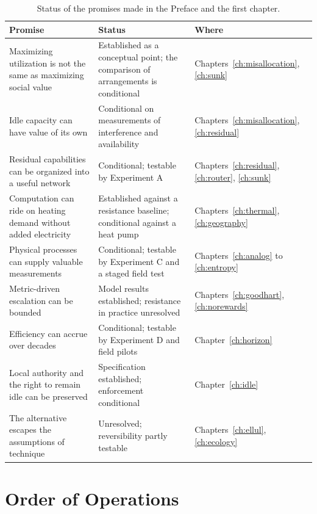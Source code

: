 \begin{table}[ht]
\centering
\small
\begin{tabular}{>{\raggedright\arraybackslash}p{2.3in}>{\raggedright\arraybackslash}p{1.9in}>{\raggedright\arraybackslash}p{1.1in}}
\toprule
Promise & Status & Where \\
\midrule
Maximizing utilization is not the same as maximizing social value & Established as a conceptual point; the comparison of arrangements is conditional & Chapters~\ref{ch:misallocation}, \ref{ch:sunk} \\
Idle capacity can have value of its own & Conditional on measurements of interference and availability & Chapters~\ref{ch:misallocation}, \ref{ch:residual} \\
Residual capabilities can be organized into a useful network & Conditional; testable by Experiment A & Chapters~\ref{ch:residual}, \ref{ch:router}, \ref{ch:sunk} \\
Computation can ride on heating demand without added electricity & Established against a resistance baseline; conditional against a heat pump & Chapters~\ref{ch:thermal}, \ref{ch:geography} \\
Physical processes can supply valuable measurements & Conditional; testable by Experiment C and a staged field test & Chapters~\ref{ch:analog} to \ref{ch:entropy} \\
Metric-driven escalation can be bounded & Model results established; resistance in practice unresolved & Chapters~\ref{ch:goodhart}, \ref{ch:norewards} \\
Efficiency can accrue over decades & Conditional; testable by Experiment D and field pilots & Chapter~\ref{ch:horizon} \\
Local authority and the right to remain idle can be preserved & Specification established; enforcement conditional & Chapter~\ref{ch:idle} \\
The alternative escapes the assumptions of technique & Unresolved; reversibility partly testable & Chapters~\ref{ch:ellul}, \ref{ch:ecology} \\
\bottomrule
\end{tabular}
\caption{Status of the promises made in the Preface and the first chapter.}
\label{tab:promises}
\end{table}

\section{Order of Operations}

